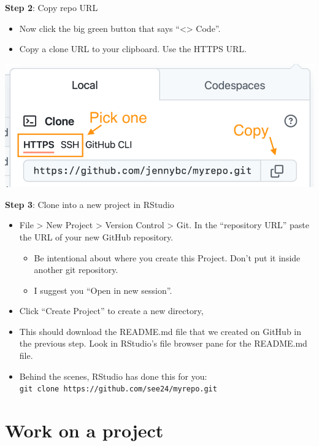 \documentclass[
  letterpaper,
  DIV=11,
  numbers=noendperiod]{scrreprt}
\providecommand{\tightlist}{%
  \setlength{\itemsep}{0pt}\setlength{\parskip}{0pt}}\usepackage{longtable,booktabs,array}
\begin{document}
\textbf{Step 2}: Copy repo URL

\begin{itemize}
\item
  Now click the big green button that says ``\textless\textgreater{}
  Code''.
\item
  Copy a clone URL to your clipboard. Use the HTTPS URL.
\end{itemize}

\includegraphics{assets/img/clone_url.png}

\textbf{Step 3}: Clone into a new project in RStudio

\begin{itemize}
\tightlist
\item
  File \textgreater{} New Project \textgreater{} Version Control
  \textgreater{} Git. In the ``repository URL'' paste the URL of your
  new GitHub repository.

  \begin{itemize}
  \tightlist
  \item
    Be intentional about where you create this Project. Don't put it
    inside another git repository.
  \item
    I suggest you ``Open in new session''.
  \end{itemize}
\item
  Click ``Create Project'' to create a new directory,
\item
  This should download the README.md file that we created on GitHub in
  the previous step. Look in RStudio's file browser pane for the
  README.md file.
\item
  Behind the scenes, RStudio has done this for you:
  \texttt{git\ clone\ https://github.com/see24/myrepo.git}
\end{itemize}

\hypertarget{work-on-a-project}{%
\section{Work on a project}\label{work-on-a-project}}
\end{document}
